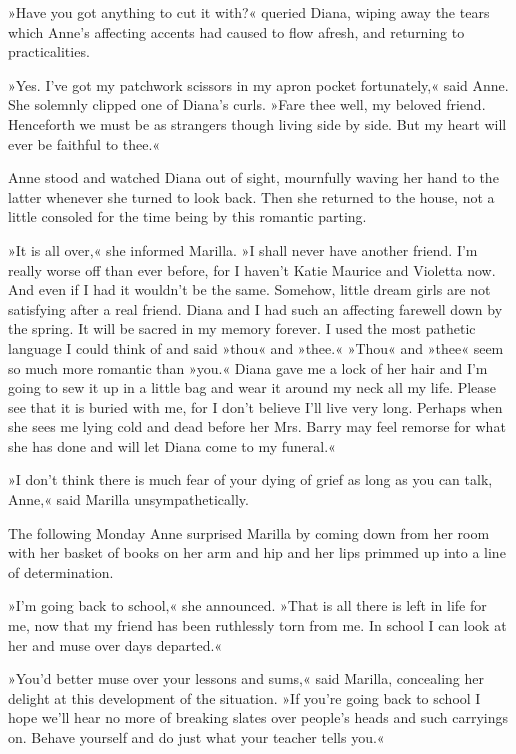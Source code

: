 »Have you got anything to cut it with?« queried Diana, wiping away the tears which Anne’s affecting accents had caused to flow afresh, and returning to practicalities.

»Yes. I’ve got my patchwork scissors in my apron pocket fortunately,« said Anne. She solemnly clipped one of Diana’s curls. »Fare thee well, my beloved friend. Henceforth we must be as strangers though living side by side. But my heart will ever be faithful to thee.«

Anne stood and watched Diana out of sight, mournfully waving her hand to the latter whenever she turned to look back. Then she returned to the house, not a little consoled for the time being by this romantic parting.

»It is all over,« she informed Marilla. »I shall never have another friend. I’m really worse off than ever before, for I haven’t Katie Maurice and Violetta now. And even if I had it wouldn’t be the same. Somehow, little dream girls are not satisfying after a real friend. Diana and I had such an affecting farewell down by the spring. It will be sacred in my memory forever. I used the most pathetic language I could think of and said »thou« and »thee.« »Thou« and »thee« seem so much more romantic than »you.« Diana gave me a lock of her hair and I’m going to sew it up in a little bag and wear it around my neck all my life. Please see that it is buried with me, for I don’t believe I’ll live very long. Perhaps when she sees me lying cold and dead before her Mrs. Barry may feel remorse for what she has done and will let Diana come to my funeral.«

»I don’t think there is much fear of your dying of grief as long as you can talk, Anne,« said Marilla unsympathetically.

The following Monday Anne surprised Marilla by coming down from her room with her basket of books on her arm and hip and her lips primmed up into a line of determination.

»I’m going back to school,« she announced. »That is all there is left in life for me, now that my friend has been ruthlessly torn from me. In school I can look at her and muse over days departed.«

»You’d better muse over your lessons and sums,« said Marilla, concealing her delight at this development of the situation. »If you’re going back to school I hope we’ll hear no more of breaking slates over people’s heads and such carryings on. Behave yourself and do just what your teacher tells you.«

